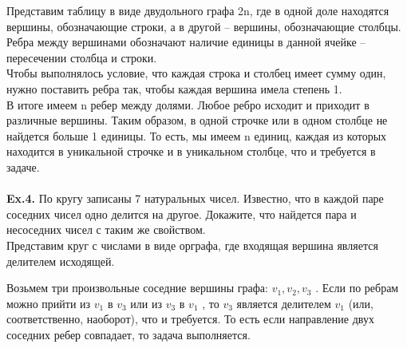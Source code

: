 \documentclass[a4paper,12pt]{article}
\begin{document}
Представим таблицу в виде двудольного графа 2n, где в одной доле находятся вершины, обозначающие строки, а в другой -- вершины, обозначающие столбцы. Ребра между вершинами обозначают наличие единицы в данной ячейке -- пересечении столбца и строки.
\\
Чтобы выполнялось условие, что каждая строка и столбец имеет сумму один, нужно поставить ребра так, чтобы каждая вершина имела степень 1.
\\
В итоге имеем n ребер между долями. Любое ребро исходит и приходит в различные вершины. Таким образом, в одной строчке или в одном столбце не найдется больше 1 единицы. То есть, мы имеем n единиц, каждая из которых находится в уникальной строчке и в уникальном столбце, что и требуется в задаче.
\\
\\
\textbf{Ex.4.} По кругу записаны 7 натуральных чисел. Известно, что в каждой паре соседних чисел одно делится на другое. Докажите, что найдется пара и несоседних чисел с таким же свойством.
\\

Представим круг с числами в виде орграфа, где входящая вершина является делителем исходящей.


Возьмем три произвольные соседние вершины графа: $  v_1 , v_2 , v_3 $ . Если по ребрам можно прийти из $ v_1 $ в $ v_3 $ или из $ v_3 $ в $ v_1 $ , то $ v_3 $ является делителем $ v_1 $ (или, соответственно, наоборот), что и требуется. То есть если направление двух соседних ребер совпадает, то задача выполняется.
\end{document}
